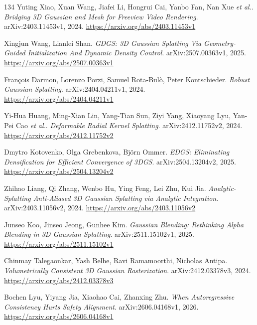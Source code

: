\documentclass[11pt,a4paper]{article}
\begin{document}
\begin{thebibliography}{134}
Yuting Xiao, Xuan Wang, Jiafei Li, Hongrui Cai, Yanbo Fan, Nan Xue \emph{et al.}.
\newblock \emph{Bridging 3D Gaussian and Mesh for Freeview Video Rendering}.
\newblock arXiv:2403.11453v1, 2024.
\newblock \url{https://arxiv.org/abs/2403.11453v1}

Xingjun Wang, Lianlei Shan.
\newblock \emph{GDGS: 3D Gaussian Splatting Via Geometry-Guided Initialization And Dynamic Density Control}.
\newblock arXiv:2507.00363v1, 2025.
\newblock \url{https://arxiv.org/abs/2507.00363v1}

Fran\c{c}ois Darmon, Lorenzo Porzi, Samuel Rota-Bul\`{o}, Peter Kontschieder.
\newblock \emph{Robust Gaussian Splatting}.
\newblock arXiv:2404.04211v1, 2024.
\newblock \url{https://arxiv.org/abs/2404.04211v1}

Yi-Hua Huang, Ming-Xian Lin, Yang-Tian Sun, Ziyi Yang, Xiaoyang Lyu, Yan-Pei Cao \emph{et al.}.
\newblock \emph{Deformable Radial Kernel Splatting}.
\newblock arXiv:2412.11752v2, 2024.
\newblock \url{https://arxiv.org/abs/2412.11752v2}

Dmytro Kotovenko, Olga Grebenkova, Bj\"{o}rn Ommer.
\newblock \emph{EDGS: Eliminating Densification for Efficient Convergence of 3DGS}.
\newblock arXiv:2504.13204v2, 2025.
\newblock \url{https://arxiv.org/abs/2504.13204v2}

Zhihao Liang, Qi Zhang, Wenbo Hu, Ying Feng, Lei Zhu, Kui Jia.
\newblock \emph{Analytic-Splatting Anti-Aliased 3D Gaussian Splatting via Analytic Integration}.
\newblock arXiv:2403.11056v2, 2024.
\newblock \url{https://arxiv.org/abs/2403.11056v2}

Junseo Koo, Jinseo Jeong, Gunhee Kim.
\newblock \emph{Gaussian Blending: Rethinking Alpha Blending in 3D Gaussian Splatting}.
\newblock arXiv:2511.15102v1, 2025.
\newblock \url{https://arxiv.org/abs/2511.15102v1}

Chinmay Talegaonkar, Yash Belhe, Ravi Ramamoorthi, Nicholas Antipa.
\newblock \emph{Volumetrically Consistent 3D Gaussian Rasterization}.
\newblock arXiv:2412.03378v3, 2024.
\newblock \url{https://arxiv.org/abs/2412.03378v3}

Bochen Lyu, Yiyang Jia, Xiaohao Cai, Zhanxing Zhu.
\newblock \emph{When Autoregressive Consistency Hurts Safety Alignment}.
\newblock arXiv:2606.04168v1, 2026.
\newblock \url{https://arxiv.org/abs/2606.04168v1}


\end{thebibliography}
\end{document}
